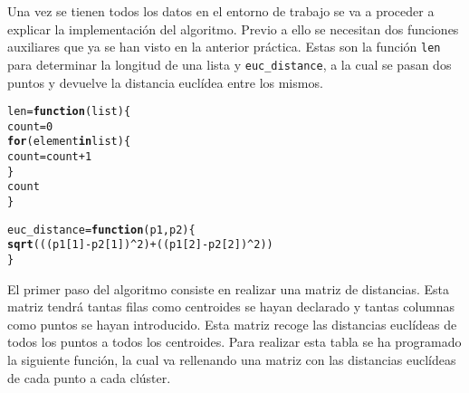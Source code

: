 \documentclass[12pt]{report}\usepackage[]{graphicx}\usepackage[dvipsnames]{xcolor}
\makeatletter
\newcommand{\hlnum}[1]{\textcolor[rgb]{0.686,0.059,0.569}{#1}}%
\newcommand{\hlopt}[1]{\textcolor[rgb]{0,0,0}{#1}}%
\newcommand{\hlstd}[1]{\textcolor[rgb]{0.345,0.345,0.345}{#1}}%
\newcommand{\hlkwa}[1]{\textcolor[rgb]{0.161,0.373,0.58}{\textbf{#1}}}%
\newcommand{\hlkwb}[1]{\textcolor[rgb]{0.69,0.353,0.396}{#1}}%
\newcommand{\hlkwc}[1]{\textcolor[rgb]{0.333,0.667,0.333}{#1}}%
\newcommand{\hlkwd}[1]{\textcolor[rgb]{0.737,0.353,0.396}{\textbf{#1}}}%
\newenvironment{kframe}{%
 \def\at@end@of@kframe{}%
 \ifinner\ifhmode%
  \def\at@end@of@kframe{\end{minipage}}%
  \begin{minipage}{\columnwidth}%
 \fi\fi%
 \def\FrameCommand##1{\hskip\@totalleftmargin \hskip-\fboxsep
 \colorbox{shadecolor}{##1}\hskip-\fboxsep
     \hskip-\linewidth \hskip-\@totalleftmargin \hskip\columnwidth}%
 \MakeFramed {\advance\hsize-\width
   \@totalleftmargin\z@ \linewidth\hsize
   \@setminipage}}%
 {\par\unskip\endMakeFramed%
 \at@end@of@kframe}
\newenvironment{knitrout}{}{} %
\makeatother
\begin{document}
				 Una vez se tienen todos los datos en el entorno de trabajo se va a proceder a explicar la implementación del algoritmo. Previo a ello se necesitan dos funciones auxiliares que ya se han visto en la anterior práctica. Estas son la función \texttt{len} para determinar la longitud de una lista y \texttt{euc\_distance}, a la cual se pasan dos puntos y devuelve la distancia euclídea entre los mismos.
				 
\begin{knitrout}
\color{fgcolor}\begin{kframe}
\begin{alltt}
\hlstd{len} \hlkwb{=} \hlkwa{function}\hlstd{(}\hlkwc{list}\hlstd{) \{}
        \hlstd{count} \hlkwb{=} \hlnum{0}
        \hlkwa{for} \hlstd{(element} \hlkwa{in} \hlstd{list) \{}
                \hlstd{count} \hlkwb{=} \hlstd{count} \hlopt{+} \hlnum{1}
        \hlstd{\}}
        \hlstd{count}
\hlstd{\}}

\hlstd{euc_distance} \hlkwb{=} \hlkwa{function}\hlstd{(}\hlkwc{p1}\hlstd{,} \hlkwc{p2}\hlstd{) \{}
        \hlkwd{sqrt}\hlstd{(((p1[}\hlnum{1}\hlstd{]} \hlopt{-} \hlstd{p2[}\hlnum{1}\hlstd{])}\hlopt{^}\hlnum{2}\hlstd{)} \hlopt{+} \hlstd{((p1[}\hlnum{2}\hlstd{]} \hlopt{-} \hlstd{p2[}\hlnum{2}\hlstd{])}\hlopt{^}\hlnum{2}\hlstd{))}
\hlstd{\}}
\end{alltt}
\end{kframe}
\end{knitrout}
				 
				 El primer paso del algoritmo consiste en realizar una matriz de distancias. Esta matriz tendrá tantas filas como centroides se hayan declarado y tantas columnas como puntos se hayan introducido. Esta matriz recoge las distancias euclídeas de todos los puntos a todos los centroides. Para realizar esta tabla se ha programado la siguiente función, la cual va rellenando una matriz con las distancias euclídeas de cada punto a cada clúster.
				 
\end{document}
